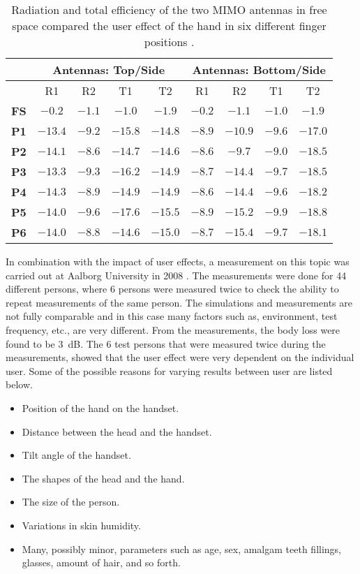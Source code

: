 \begin{table}[]
\centering
\begin{tabular}{|c|c|c|c|c|c|c|c|c|}
\hline
            & \multicolumn{4}{c|}{\textbf{Antennas: Top/Side}} & \multicolumn{4}{c|}{\textbf{Antennas: Bottom/Side}} \\ \hline
             & R1      & R2     & T1      & T2      & R1     & R2      & T1     & T2          \\ \hline
\textbf{FS}  & $-0.2 $ & $-1.1$ & $-1.0 $ & $-1.9 $ & $-0.2$ & $-1.1 $ & $-1.0$ & $-1.9 $       \\ \hline
\textbf{P1}  & $-13.4$ & $-9.2$ & $-15.8$ & $-14.8$ & $-8.9$ & $-10.9$ & $-9.6$ & $-17.0$       \\ \hline
\textbf{P2}  & $-14.1$ & $-8.6$ & $-14.7$ & $-14.6$ & $-8.6$ & $-9.7 $ & $-9.0$ & $-18.5$       \\ \hline
\textbf{P3}  & $-13.3$ & $-9.3$ & $-16.2$ & $-14.9$ & $-8.7$ & $-14.4$ & $-9.7$ & $-18.5$       \\ \hline
\textbf{P4}  & $-14.3$ & $-8.9$ & $-14.9$ & $-14.9$ & $-8.6$ & $-14.4$ & $-9.6$ & $-18.2$       \\ \hline
\textbf{P5}  & $-14.0$ & $-9.6$ & $-17.6$ & $-15.5$ & $-8.9$ & $-15.2$ & $-9.9$ & $-18.8$       \\ \hline
\textbf{P6}  & $-14.0$ & $-8.8$ & $-14.6$ & $-15.0$ & $-8.7$ & $-15.4$ & $-9.7$ & $-18.1$       \\ \hline
\end{tabular}
\caption{Radiation and total efficiency of the two MIMO antennas in free space compared the user effect of the hand in six different finger positions \cite{Samantha2014UserEff}.}
\label{tab:usereff_radeff}
\end{table}


In combination with the impact of user effects, a measurement on this topic was carried out at Aalborg University in 2008 \cite{sanchez2008multiband}.
The measurements were done for 44 different persons, where 6 persons were measured twice to check the ability to repeat measurements of the same person.  
The simulations and measurements are not fully comparable and in this case many factors such as, environment, test frequency, etc., are very different. From the measurements, the body loss were found to be \SI{3}{dB}. The 6 test persons that were measured twice during the measurements, showed that the user effect were very dependent on the individual user. 
Some of the possible reasons for varying results between user are listed below. 
\begin{itemize}
\item Position of the hand on the handset.
\item Distance between the head and the handset.
\item Tilt angle of the handset.
\item The shapes of the head and the hand.
\item The size of the person.
\item Variations in skin humidity.
\item Many, possibly minor, parameters such as age, sex, amalgam teeth fillings, glasses, amount of hair, and so forth.
\end{itemize}


